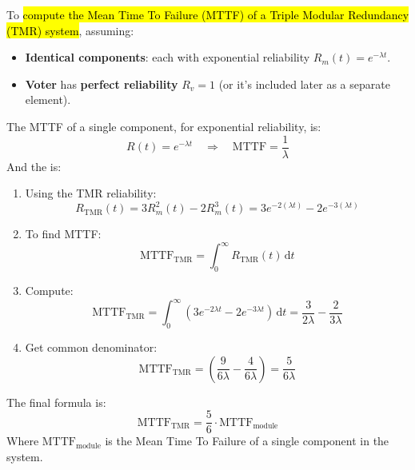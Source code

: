 \highspace
To \hl{compute the Mean Time To Failure (MTTF) of a Triple Modular Redundancy (TMR) system}, assuming:
\begin{itemize}
    \item \textbf{Identical components}: each with exponential reliability $R_{m}\left(t\right) = e^{-\lambda t}$.
    \item \textbf{Voter} has \textbf{perfect reliability} $R_{v} = 1$ (or it's included later as a separate element).
\end{itemize}
The MTTF of a single component, for exponential reliability, is:
\begin{equation*}
    R(t) = e^{-\lambda t} \quad \Rightarrow \quad \text{MTTF} = \dfrac{1}{\lambda}
\end{equation*}
And the  is:
\begin{enumerate}
    \item Using the TMR reliability:
    \begin{equation*}
        R_{\text{TMR}}(t) = 3 R_m^2(t) - 2 R_m^3(t) = 3 e^{-2\left(\lambda t\right)} - 2 e^{-3\left(\lambda t\right)}
    \end{equation*}

    \item To find MTTF:
    \begin{equation*}
        \text{MTTF}_{\text{TMR}} = \displaystyle\int_{0}^{\infty} R_{\text{TMR}}(t) \, \mathrm{d}t
    \end{equation*}

    \item Compute:
    \begin{equation*}
        \text{MTTF}_{\text{TMR}} = \int_{0}^{\infty} \left( 3 e^{-2\lambda t} - 2 e^{-3\lambda t} \right) \, \mathrm{d}t = \dfrac{3}{2\lambda} - \frac{2}{3\lambda}
    \end{equation*}

    \item Get common denominator:
    \begin{equation*}
        \text{MTTF}_{\text{TMR}} = \left( \dfrac{9}{6\lambda} - \dfrac{4}{6\lambda} \right) = \dfrac{5}{6\lambda}
    \end{equation*}
\end{enumerate}
The final formula is:
\begin{equation}
    \text{MTTF}_{\text{TMR}} = \frac{5}{6} \cdot \text{MTTF}_{\text{module}}
\end{equation}
Where $\text{MTTF}_{\text{module}}$ is the Mean Time To Failure of a single component in the system.

